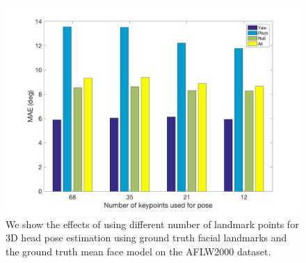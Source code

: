 \documentclass[10pt,twocolumn,letterpaper]{article}
\begin{document}
\begin{figure}[t]
\begin{center}
   \includegraphics[width=1\linewidth]{num_keypoints}
\end{center}
   \caption{We show the effects of using different number of landmark points for 3D head pose estimation using ground truth facial landmarks and the ground truth mean face model on the AFLW2000 dataset.}
   \label{num_keypoints}
\end{figure}
\end{document}
